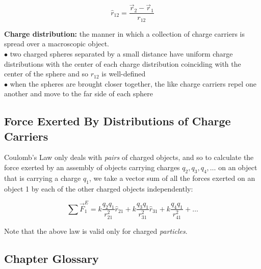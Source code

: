         \[
            \hat{r}_{12} = \frac{\vec{r}_2 - \vec{r}_1}{r_{12}}
        \]

        \textbf{Charge distribution:} the manner in which a collection of charge carriers is spread over a macroscopic object. \\
        $\bullet$ two charged spheres separated by a small distance have uniform charge distributions with the center of each charge distribution coinciding with the center of the sphere and so $r_{12}$ is well-defined \\
        $\bullet$ when the spheres are brought closer together, the like charge carriers repel one another and move to the far side of each sphere

    \subsection{Force Exerted By Distributions of Charge Carriers}      %

        Coulomb's Law only deals with \textit{pairs} of charged objects, and so to calculate the force exerted by an assembly of objects carrying charges $q_2, q_3, q_4,\dots$ on an object that is carrying a charge $q_1$,
        we take a vector sum of all the forces exerted on an object 1 by each of the other charged objects independently:

        \[
            \sum \vec{F}_{1}^E = k\frac{q_2 q_1}{r^2_{21}}\hat{r}_{21} + k\frac{q_3 q_1}{r^2_{31}}\hat{r}_{31} + k\frac{q_4 q_1}{r^2_{41}} + \dots
        \]

        Note that the above law is valid only for charged \textit{particles}. \\

    \subsection{Chapter Glossary}

